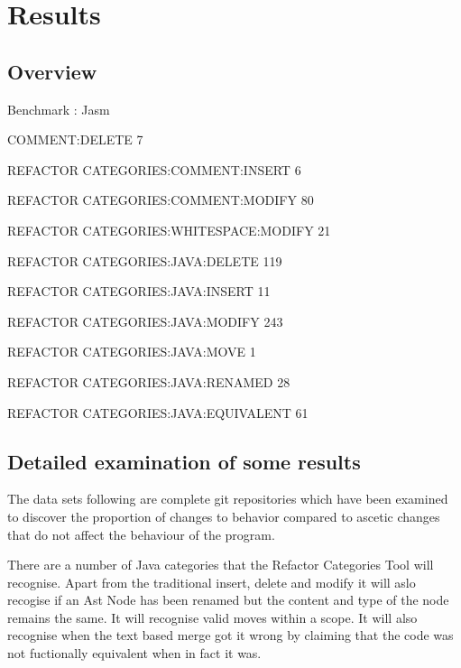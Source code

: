 \section{Results}
\subsection{Overview}
Benchmark : Jasm 


COMMENT:DELETE 7

REFACTOR CATEGORIES:COMMENT:INSERT 6

REFACTOR CATEGORIES:COMMENT:MODIFY 80

REFACTOR CATEGORIES:WHITESPACE:MODIFY 21

REFACTOR CATEGORIES:JAVA:DELETE 119

REFACTOR CATEGORIES:JAVA:INSERT 11

REFACTOR CATEGORIES:JAVA:MODIFY 243

REFACTOR CATEGORIES:JAVA:MOVE 1

REFACTOR CATEGORIES:JAVA:RENAMED 28

REFACTOR CATEGORIES:JAVA:EQUIVALENT 61


\subsection{Detailed examination of some results}

The data sets following are complete git repositories which have been examined to discover the proportion of changes to behavior compared to ascetic changes that do not affect the behaviour of the program. 

% 
% 




There are a number of Java categories that the Refactor Categories Tool will recognise.  Apart from the traditional insert, delete and modify it will aslo recogise if an Ast Node has been renamed but the content and type of the node remains the same.  It will recognise valid moves within a scope. It will also recognise when the text based merge got it wrong by claiming that the code was not fuctionally equivalent when in fact it was.

